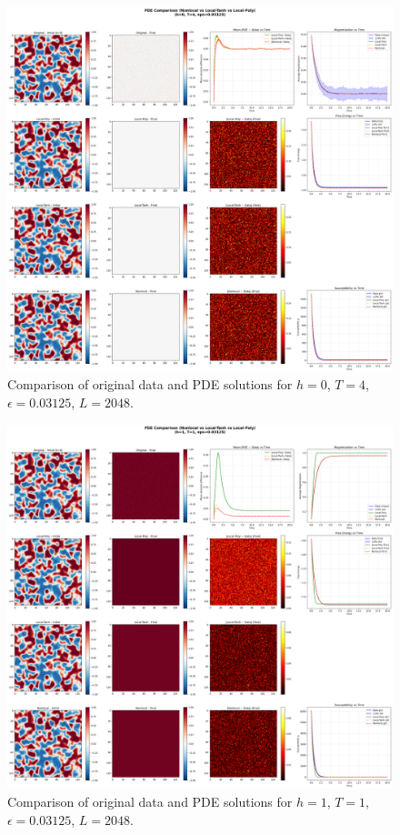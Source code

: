 \documentclass[11pt,a4paper]{article}
\begin{document}
\begin{figure}[h]
    \centering
    \includegraphics[width=1.0\textwidth]{fig/compare_pde_solvers_L2048_h0_T4_eps0.03125.png}
    \caption{Comparison of original data and PDE solutions for $h=0$, $T=4$, $\epsilon=0.03125$, $L=2048$.}
    \label{fig:pde_comparison_h0_T4_eps0.03125_L2048}
\end{figure}


\begin{figure}[!h]
    \centering
    \includegraphics[width=1.0\textwidth]{fig/compare_pde_solvers_L2048_h1_T1_eps0.03125.png}
    \caption{Comparison of original data and PDE solutions for $h=1$, $T=1$, $\epsilon=0.03125$, $L=2048$.}
    \label{fig:pde_comparison_h1_T1_eps0.03125_L2048}
\end{figure}
\end{document}
